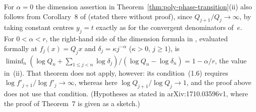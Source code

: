 \begin{remark}\label{rem:poly-BLR}
For $\alpha=0$ the dimension assertion in Theorem~\ref{thm:poly-phase-transition}(ii)
also follows from Corollary~8 of \cite{BLR} (stated there without proof), since
$Q_{j+1}/Q_j\to\infty$, by taking
constant centres $y_j=t$ exactly as for the convergent denominators of~$e$.
For $0<\alpha<r$, the right-hand side of the dimension formula in
\cite[Theorem~7]{BLR}, evaluated formally at $f_j(x)=Q_jx$ and $\delta_j=\kappa j^{-\alpha}$ ($\kappa>0$, $j\ge1$),
is $\liminf_n(\log Q_n+\sum_{1\le j<n}\log\delta_j)/(\log Q_n-\log\delta_n)=1-\alpha/r$,
the value in~(ii). That theorem does not apply, however: its condition~(1.6) requires
$\log f'_{j+1}/\log f'_j\to\infty$, whereas here $\log Q_{j+1}/\log Q_j\to1$, and the
proof above does not use that condition. (Hypotheses as stated in arXiv:1710.03596v1, where the proof of Theorem~7 is
given as a sketch.)
\end{remark}

